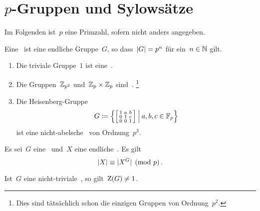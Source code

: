 \clearpage





\section{\texorpdfstring{$p$}{p}-Gruppen und Sylowsätze}

\begin{convention}
  Im Folgenden ist~$p$ eine Primzahl, sofern nicht anders angegeben.
\end{convention}

\begin{definition}
  Eine~ ist eine endliche Gruppe~$G$, so dass~$\lvert G\rvert = p^n$ für ein~$n \in \mathbb{N}$ gilt.
\end{definition}

\begin{example}
  \leavevmode
  \begin{enumerate}
    \item
      Die triviale Gruppe~$1$ ist eine~.
    \item
      Die Gruppen~$\mathbb{Z}_{p^2}$ und~$\mathbb{Z}_p \times \mathbb{Z}_p$ sind~.%
      \footnote{
        Dies sind tätsächlich schon die einzigen Gruppen von Ordnung~$p^2$.
      }
    \item
      Die Heisenberg-Gruppe
      \[
        G
        \defined
        \left\{
          \begin{bsmallmatrix}
            1 & a & b \\
            0 & 1 & c \\
            0 & 0 & 1
          \end{bsmallmatrix}
        \suchthat*
          a, b, c \in \Finite_p
        \right\}
      \]
      ist eine nicht-abelsche~ von Ordnung~$p^3$.
  \end{enumerate}
\end{example}

\begin{proposition}
  Es sei~$G$ eine~ und~$X$ eine endliche~.
  Es gilt
  \[
    \lvert X\rvert \equiv \lvert X^G\rvert \pmod{p} \,.  
  \]
\end{proposition}

\begin{corollary}
  Ist~$G$ eine nicht-triviale~, so gilt~$\operatorname{Z}(G) \neq 1$.
\end{corollary}


